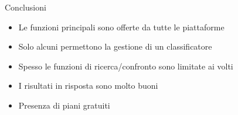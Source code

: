 %
\begin{frame}[t]{Conclusioni}
\begin{itemize}
	\item Le funzioni principali sono offerte da tutte le piattaforme
	\item Solo alcuni permettono la gestione di un classificatore
	\item Spesso le funzioni di ricerca/confronto sono limitate ai volti
	\item I risultati in risposta sono molto buoni
	\item Presenza di piani gratuiti
\end{itemize}
\end{frame}
%
